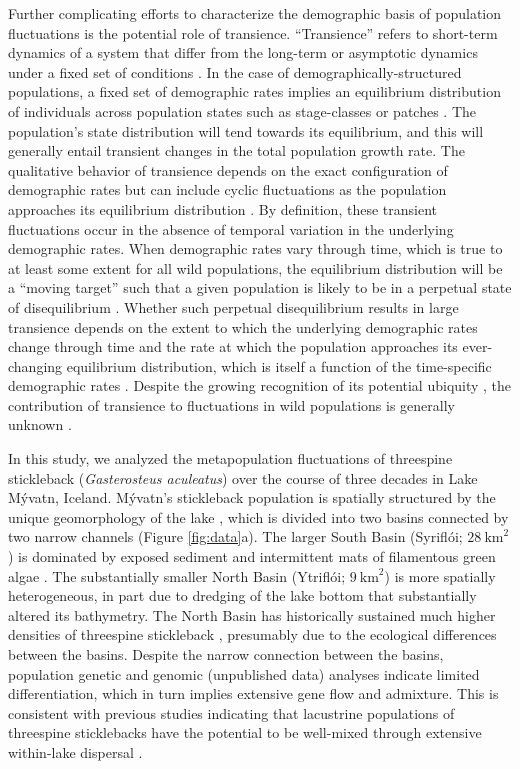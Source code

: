 \documentclass[11pt]{article}
\begin{document}
Further complicating efforts to characterize the demographic basis
of population fluctuations is the potential role of transience.
``Transience'' refers to short-term dynamics of a system
that differ from the long-term or asymptotic dynamics under a fixed set of conditions
\citep{hastings2010}.
In the case of demographically-structured populations,
a fixed set of demographic rates implies an equilibrium distribution
of individuals across population states such as stage-classes or patches
\citep{caswell2001matrix}.
The population's state distribution will tend towards its equilibrium,
and this will generally entail transient changes
in the total population growth rate.
The qualitative behavior of transience depends
on the exact configuration of demographic rates
but can include cyclic fluctuations
as the population approaches its equilibrium distribution
\citep{caswell2001matrix}.
By definition, these transient fluctuations occur in the absence
of temporal variation in the underlying demographic rates.
When demographic rates vary through time,
which is true to at least some extent for all wild populations,
the equilibrium distribution will be a ``moving target''
such that a given population is likely to be in a perpetual state of disequilibrium
\citep{fox2000population, koons2017understanding}.
Whether such perpetual disequilibrium results in large transience
depends on the extent to which the underlying demographic rates change through time
and the rate at which the population approaches its ever-changing equilibrium distribution,
which is itself a function of the time-specific demographic rates
\citep{caswell2005reactivity, caswell2007sensitivity}.
Despite the growing recognition of its potential ubiquity
\citep{caswell2007sensitivity, koons2017understanding},
the contribution of transience to fluctuations in wild populations is generally unknown
\citep[but see][]{hoy2020fluctuations}.

In this study,
we analyzed the metapopulation fluctuations of threespine stickleback
(\textit{Gasterosteus aculeatus})
over the course of three decades in Lake M\'{y}vatn, Iceland.
M\'{y}vatn's stickleback population is spatially structured by the unique geomorphology
of the lake \citep{gislason1998, millet2013},
which is divided into two basins connected by two narrow channels
(Figure \ref{fig:data}a).
The larger South Basin (Sy{\dh}rifl\'{o}i; $28~\text{km}^2$)
is dominated by exposed sediment and intermittent mats of filamentous green algae
\citep{einarsson2004myvatn}.
The substantially smaller North Basin (Ytrifl\'{o}i; $9~\text{km}^2$)
is more spatially heterogeneous,
in part due to dredging of the lake bottom
that substantially altered its bathymetry.
The North Basin has historically sustained much higher
densities of threespine stickleback  \citep{gislason1998},
presumably due to the ecological differences between the basins.
Despite the narrow connection between the basins,
population genetic \citep{millet2013}
and genomic (unpublished data) analyses indicate limited differentiation,
which in turn implies extensive gene flow and admixture.
This is consistent with previous studies indicating that lacustrine populations
of threespine sticklebacks have the potential to be
well-mixed through extensive within-lake dispersal
\citep{bolnick2009phenotype}.
\end{document}

